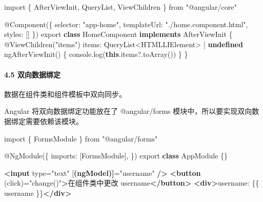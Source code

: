 \documentclass[
]{article}
\newenvironment{Shaded}{}{}
\newcommand{\AttributeTok}[1]{\textcolor[rgb]{0.49,0.56,0.16}{#1}}
\newcommand{\BuiltInTok}[1]{#1}
\newcommand{\DataTypeTok}[1]{\textcolor[rgb]{0.56,0.13,0.00}{#1}}
\newcommand{\ErrorTok}[1]{\textcolor[rgb]{1.00,0.00,0.00}{\textbf{#1}}}
\newcommand{\FunctionTok}[1]{\textcolor[rgb]{0.02,0.16,0.49}{#1}}
\newcommand{\ImportTok}[1]{#1}
\newcommand{\KeywordTok}[1]{\textcolor[rgb]{0.00,0.44,0.13}{\textbf{#1}}}
\newcommand{\NormalTok}[1]{#1}
\newcommand{\OperatorTok}[1]{\textcolor[rgb]{0.40,0.40,0.40}{#1}}
\newcommand{\OtherTok}[1]{\textcolor[rgb]{0.00,0.44,0.13}{#1}}
\newcommand{\StringTok}[1]{\textcolor[rgb]{0.25,0.44,0.63}{#1}}
\begin{document}
\begin{Shaded}
\begin{Highlighting}[]
\ImportTok{import}\NormalTok{ \{ AfterViewInit}\OperatorTok{,}\NormalTok{ QueryList}\OperatorTok{,}\NormalTok{ ViewChildren \} }\ImportTok{from} \StringTok{"@angular/core"}

\NormalTok{@}\FunctionTok{Component}\NormalTok{(\{}
  \DataTypeTok{selector}\OperatorTok{:} \StringTok{"app{-}home"}\OperatorTok{,}
  \DataTypeTok{templateUrl}\OperatorTok{:} \StringTok{"./home.component.html"}\OperatorTok{,}
  \DataTypeTok{styles}\OperatorTok{:}\NormalTok{ []}
\NormalTok{\})}
\ImportTok{export} \KeywordTok{class}\NormalTok{ HomeComponent }\KeywordTok{implements}\NormalTok{ AfterViewInit \{}
\NormalTok{  @}\FunctionTok{ViewChildren}\NormalTok{(}\StringTok{"items"}\NormalTok{) }\DataTypeTok{items}\OperatorTok{:}\NormalTok{ QueryList}\OperatorTok{\textless{}}\BuiltInTok{HTMLLIElement}\OperatorTok{\textgreater{}} \OperatorTok{|} \KeywordTok{undefined}
  \FunctionTok{ngAfterViewInit}\NormalTok{() \{}
    \BuiltInTok{console}\OperatorTok{.}\FunctionTok{log}\NormalTok{(}\KeywordTok{this}\OperatorTok{.}\AttributeTok{items}\OperatorTok{?.}\FunctionTok{toArray}\NormalTok{())}
\NormalTok{  \}}
\NormalTok{\}}
\end{Highlighting}
\end{Shaded}

\hypertarget{45-ux53ccux5411ux6570ux636eux7ed1ux5b9a}{%
\paragraph{4.5
双向数据绑定}\label{45-ux53ccux5411ux6570ux636eux7ed1ux5b9a}}

数据在组件类和组件模板中双向同步。

Angular 将双向数据绑定功能放在了 @angular/forms
模块中，所以要实现双向数据绑定需要依赖该模块。

\begin{Shaded}
\begin{Highlighting}[]
\ImportTok{import}\NormalTok{ \{ FormsModule \} }\ImportTok{from} \StringTok{"@angular/forms"}

\NormalTok{@}\FunctionTok{NgModule}\NormalTok{(\{}
  \DataTypeTok{imports}\OperatorTok{:}\NormalTok{ [FormsModule]}\OperatorTok{,}
\NormalTok{\})}
\ImportTok{export} \KeywordTok{class}\NormalTok{ AppModule \{\}}
\end{Highlighting}
\end{Shaded}

\begin{Shaded}
\begin{Highlighting}[]
\KeywordTok{\textless{}input}\OtherTok{ type=}\StringTok{"text"}\OtherTok{ [}\ErrorTok{(ngModel)]}\OtherTok{=}\StringTok{"username"} \KeywordTok{/\textgreater{}}
\KeywordTok{\textless{}button}\OtherTok{ (click)=}\StringTok{"change()"}\KeywordTok{\textgreater{}}\NormalTok{在组件类中更改 username}\KeywordTok{\textless{}/button\textgreater{}}
\KeywordTok{\textless{}div\textgreater{}}\NormalTok{username: \{\{ username \}\}}\KeywordTok{\textless{}/div\textgreater{}}
\end{Highlighting}
\end{Shaded}
\end{document}
